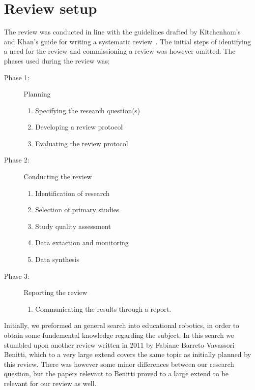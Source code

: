 \section{Review setup}\label{ch:literatureProcess}
The review was conducted in line with the guidelines drafted by Kitchenham's and Khan's guide for writing a systematic review~\cite{kitchenham2007guidelines,khan2001undertaking}. 
The initial steps of identifying a need for the review and commissioning a review was however omitted. 
The phases used during the review was; 
\begin{description}
	\item[Phase 1: ] Planning
		\begin{enumerate}
			\item Specifying the research question(s)
			\item Developing a review protocol
			\item Evaluating the review protocol
		\end{enumerate}
	\item[Phase 2: ] Conducting the review
		\begin{enumerate}
			\item Identification of research
			\item Selection of primary studies
			\item Study quality assessment
			\item Data extaction and monitoring
			\item Data synthesis
		\end{enumerate}
	\item[Phase 3: ] Reporting the review
		\begin{enumerate}
			\item Communicating the results through a report.
		\end{enumerate}
\end{description}

\bigskip\noindent
Initially, we preformed an general search into educational robotics, in order to obtain some fundemental knowledge regarding the subject. In this search we stumbled upon another review written in 2011 by Fabiane Barreto Vavassori Benitti\cite{Benitti2012978}, which to a very large extend covers the same topic as initially planned by this review. There was however some minor differences between our research question, but the papers relevant to Benitti proved to a large extend to be relevant for our review as well. 

